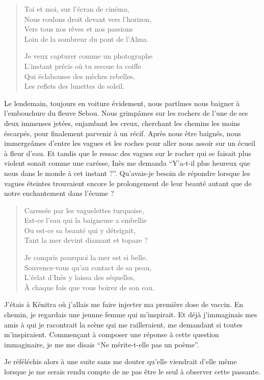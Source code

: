 \begin{verse}
Toi et moi, sur l’écran de cinéma,\\
Nous roulons droit devant vers l’horizon,\\
Vers tous nos rêves et nos passions\\
Loin de la sombreur du pont de l’Alma.

Je veux capturer comme un photographe\\
L’instant précis où tu secoue ta coiffe\\
Qui éclabousse des mèches rebelles,\\
Les reflets des lunettes de soleil.
\end{verse}

\begin{prose}
Le lendemain, toujours en voiture évidement, nous partîmes nous baigner à l’embouchure du fleuve Sebou. Nous grimpâmes  sur les rochers de l’une de ses deux immenses jetées, enjambant les creux, cherchant les chemins les moins éscarpés, pour finalement parvenir à un récif. Après nous être baignés, nous immergeâmes d’entre les vagues et les roches pour aller nous assoir sur un écueil à fleur d’eau. Et tandis que le ressac des vagues sur le rocher qui se faisait plus violent sonait comme une carésse, Inès me demanda \enquote{Y’a-t-il plus heureux que nous dans le monde à cet instant ?}. Qu’avais-je besoin de  répondre lorsque les vagues éteintes trouvaient encore le prolongement de leur beauté autant que de notre enchantement dans l’écume ?

\end{prose}

\begin{verse}
Caressée par les vaguelettes turquoise,\\
Est-ce l’eau qui la baigneuse a embellie\\
Ou est-ce sa beauté qui y déteignit,\\
Tant la mer devint diamant et topaze ?

Je compris pourquoi la mer est si belle.\\
Souvenez-vous qu’au contact de sa peau,\\
L’éclat d’Inès y laissa des séquelles,\\
À chaque fois que vous boirez de son eau.
\end{verse}

\begin{prose}
J’étais à Kénitra où j’allais me faire injecter ma première dose de vaccin. En chemin, je regardais une jeunne femme qui m’inspirait. Et déjà j’immaginais mes amis à qui je racontrait la scène qui me railleraient, me demandant si toutes m’inspiraient. Commençant à composer une réponse à cette question immaginaire, je me me disais \enquote{Ne mérite-t-elle pas un poème}.

Je réféléchis alors à une  suite sans me douter qu’elle viendrait d’elle même lorsque je me serais rendu compte de ne pas être le seul à observer cette passante.
\end{prose}

